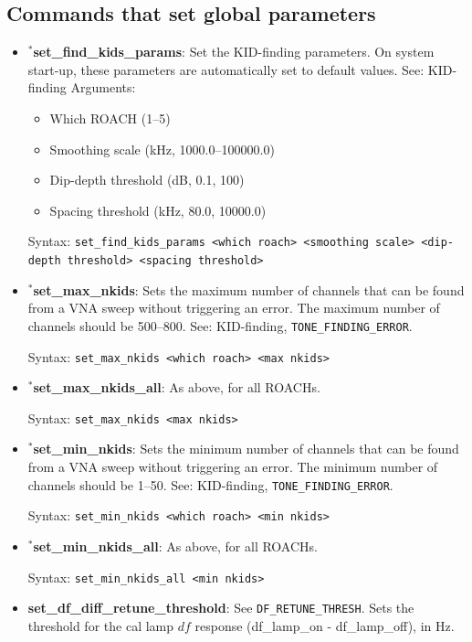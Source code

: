 \subsection{Commands that set global parameters}
\begin{itemize}[leftmargin=*,label={}]

\item $^{*}$\textbf{set\_find\_kids\_params}: Set the KID-finding parameters. On system start-up, these parameters are automatically set to default values. See: KID-finding
Arguments:
\begin{itemize}
  \item Which ROACH (1--5)
  \item Smoothing scale (kHz, 1000.0--100000.0)
  \item Dip-depth threshold (dB, 0.1, 100)
  \item Spacing threshold (kHz, 80.0, 10000.0)
\end{itemize}

Syntax: \texttt{set\_find\_kids\_params <which roach> <smoothing scale> <dip-depth threshold> <spacing threshold>}

\item $^{*}$\textbf{set\_max\_nkids}: Sets the maximum number of channels that can be found from a VNA sweep without triggering an error. The maximum number of channels should be 500--800. See: KID-finding, \texttt{TONE\_FINDING\_ERROR}.

Syntax: \texttt{set\_max\_nkids <which roach> <max nkids>}

\item $^{*}$\textbf{set\_max\_nkids\_all}: As above, for all ROACHs.

Syntax: \texttt{set\_max\_nkids <max nkids>}

\item $^{*}$\textbf{set\_min\_nkids}: Sets the minimum number of channels that can be found from a VNA sweep without triggering an error. The minimum number of channels should be 1--50. See: KID-finding, \texttt{TONE\_FINDING\_ERROR}.

Syntax: \texttt{set\_min\_nkids <which roach> <min nkids>}

\item $^{*}$\textbf{set\_min\_nkids\_all}: As above, for all ROACHs.

Syntax: \texttt{set\_min\_nkids\_all <min nkids>}

\item \textbf{set\_df\_diff\_retune\_threshold}: See \texttt{DF\_RETUNE\_THRESH}. Sets the threshold for the cal lamp $df$ response (df\_lamp\_on - df\_lamp\_off), in Hz.


\end{itemize}

